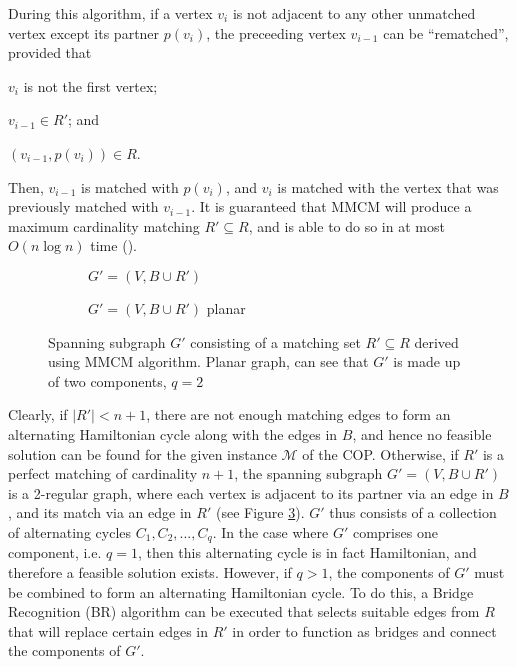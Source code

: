 \documentclass[oribibl]{llncs}
\begin{document}
During this algorithm, if a vertex $v_i$ is not adjacent to any other unmatched vertex except its partner $p(v_i)$, the preceeding vertex $v_{i-1}$ can be ``rematched'', provided that 
\begin{enumerate*}[label={(\alph*)}]
	\item $v_i$ is not the first vertex; 
	\item $v_{i-1} \in R'$; and
	\item $(v_{i-1}, p(v_i)) \in R$.
\end{enumerate*}
Then, $v_{i-1}$ is matched with $p(v_i)$, and $v_i$ is matched with the vertex that was previously matched with $v_{i-1}$. It is guaranteed that MMCM will produce a maximum cardinality matching $R' \subseteq R$, and is able to do so in at most $O(n \log n)$ time (\citealp{mahadev1994}).


\begin{figure}	
	\centering
	\begin{subfigure}[h]{0.4\textwidth}
		
		\caption{$G' = (V, B \cup R')$}	
		\label{fig:matching}
	\end{subfigure} \quad
	\begin{subfigure}[h]{0.5\textwidth}
		
		\caption{$G' =(V, B \cup R')$ planar}	
		\label{fig:mps}
	\end{subfigure}
	\caption{Spanning subgraph $G'$ consisting of a matching set $R' \subseteq R$ derived using MMCM algorithm. Planar graph, can see that $G'$ is made up of two components, $q = 2$}
	\label{fig:matching/mps}
\end{figure}


Clearly, if $|R'| < n+1$, there are not enough matching edges to form an alternating Hamiltonian cycle along with the edges in $B$, and hence no feasible solution can be found for the given instance $\mathcal{M}$ of the COP. Otherwise, if $R'$ is a perfect matching of cardinality $n+1$, the spanning subgraph $G'=(V, B \cup R')$ is a 2-regular graph, where each vertex is adjacent to its partner via an edge in $B$, and its match via an edge in $R'$ (see Figure \ref{fig:matching/mps}). $G'$ thus consists of a collection of alternating cycles $C_1, C_2, ..., C_q$. In the case where $G'$ comprises one component, i.e. $q = 1$, then this alternating cycle is in fact Hamiltonian, and therefore a feasible solution exists. However, if $q > 1$, the components of $G'$ must be combined to form an alternating Hamiltonian cycle. To do this, a Bridge Recognition (BR) algorithm can be executed that selects suitable edges from $R$ that will replace certain edges in $R'$ in order to function as bridges and connect the components of $G'$.
\end{document}
